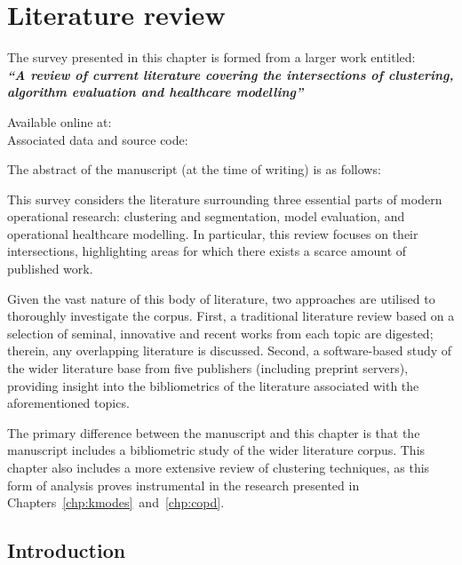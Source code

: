 \chapter{Literature review}
\label{chp:lit}

\begin{center}
    The survey presented in this chapter is formed from a larger work
    entitled:\\[1em]

    {%
        \bf\itshape{``A review of current literature covering the intersections
        of clustering, algorithm evaluation and healthcare modelling''}
    }

    Available online at:~\\
    Associated data and source code:~\vfill

    The abstract of the manuscript (at the time of writing) is as
    follows:\\[1em]
\end{center}

This survey considers the literature surrounding three essential parts of modern
operational research: clustering and segmentation, model evaluation, and
operational healthcare modelling. In particular, this review focuses on their
intersections, highlighting areas for which there exists a scarce amount of
published work.

Given the vast nature of this body of literature, two approaches are utilised to
thoroughly investigate the corpus. First, a traditional literature review based
on a selection of seminal, innovative and recent works from each topic are
digested; therein, any overlapping literature is discussed. Second, a
software-based study of the wider literature base from five publishers
(including preprint servers), providing insight into the bibliometrics of the
literature associated with the aforementioned topics.

\myrule%

The primary difference between the manuscript and this chapter is that the
manuscript includes a bibliometric study of the wider literature corpus. This
chapter also includes a more extensive review of clustering techniques, as this
form of analysis proves instrumental in the research presented in
Chapters~\ref{chp:kmodes}~and~\ref{chp:copd}.

\section{Introduction}

